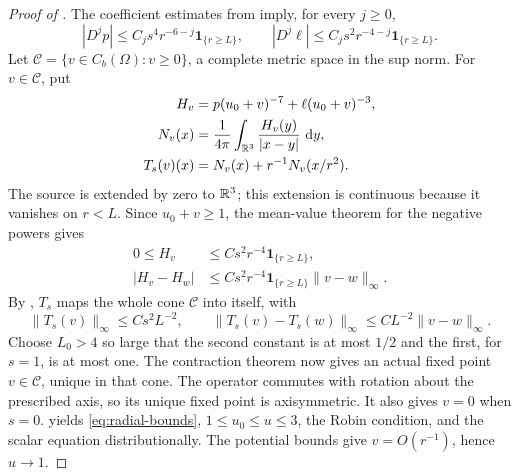 \begin{proof}[Proof of ]
The coefficient estimates from  imply,
for every $j\ge0$,
\begin{equation}\label{eq:elliptic-coefficient-bounds}
 |D^jp|\le C_js^4r^{-6-j}\mathbf1_{\{r\ge L\}},\qquad
 |D^j\ell|\le C_js^2r^{-4-j}\mathbf1_{\{r\ge L\}}.
\end{equation}
Let $\mathcal C=\{v\in C_b(\Omega):v\ge0\}$, a complete metric space
in the sup norm.  For $v\in\mathcal C$, put
\begin{equation}\label{eq:fixed-point}
 \begin{split}
 H_v&=p(u_0+v)^{-7}+\ell(u_0+v)^{-3},\\
 N_v(x)&=\frac1{4\pi}\int_{\mathbb R^3}\frac{H_v(y)}{|x-y|}\,\mathop{}\!\mathrm d y,\\
 T_s(v)(x)&=N_v(x)+r^{-1}N_v(x/r^2).
 \end{split}
\end{equation}
The source is extended by zero to $\mathbb R^3$; this extension is continuous
because it vanishes on $r<L$.  Since $u_0+v\ge1$, the mean-value theorem
for the negative powers gives
\begin{equation}\label{eq:source-contraction}
 \begin{split}
 0\le H_v&\le Cs^2r^{-4}\mathbf1_{\{r\ge L\}},\\
 |H_v-H_w|&\le Cs^2r^{-4}\mathbf1_{\{r\ge L\}}
                  \|v-w\|_\infty.
 \end{split}
\end{equation}
By , $T_s$ maps the whole cone $\mathcal C$ into itself,
with
\[
 \|T_s(v)\|_\infty\le Cs^2L^{-2},\qquad
 \|T_s(v)-T_s(w)\|_\infty\le CL^{-2}\|v-w\|_\infty.
\]
Choose $L_0>4$ so large that the second constant is at most $1/2$ and
the first, for $s=1$, is at most one.  The contraction theorem now gives
an actual fixed point $v\in\mathcal C$, unique in that cone.
The operator commutes with rotation about the prescribed axis, so its
unique fixed point is axisymmetric.  It also gives $v=0$ when $s=0$.
 yields \eqref{eq:radial-bounds}, $1\le u_0\le u\le3$,
the Robin condition, and the scalar equation distributionally.
The potential bounds give $v=O(r^{-1})$, hence $u\to1$.


\end{proof}
